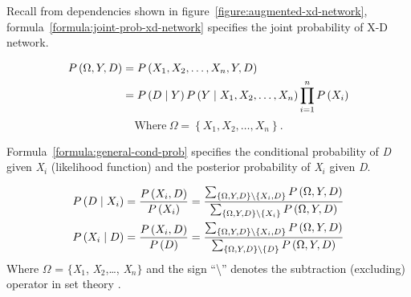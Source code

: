 \documentclass{article}
\numberwithin{equation}{section}
\numberwithin{figure}{section}
\numberwithin{table}{section}
\begin{document}
Recall from dependencies shown in figure~\ref{figure:augmented-xd-network}, formula~\ref{formula:joint-prob-xd-network} specifies the joint probability of X-D network.

\begin{equation}
\begin{split}
P\left(\mathrm{\Omega },Y,D\right)&=P\left(X_1,X_2,\dots ,X_n,Y,D\right)\\
&=P\left(D\mathrel{\left|\vphantom{D Y}\right.\kern-\nulldelimiterspace}Y\right)P\left(Y\mathrel{\left|\vphantom{Y X_1,X_2,\dots ,X_n}\right.\kern-\nulldelimiterspace}X_1,X_2,\dots ,X_n\right)\prod^n_{i=1}{P\left(X_i\right)}
\end{split}
\label{formula:joint-prob-xd-network}
\end{equation}
\[\mathrm{Where}\ \Omega=\left\{X_1,X_2,\dots,X_n\right\}\mathrm{.}\]

\noindent Formula~\ref{formula:general-cond-prob} specifies the conditional probability of \textit{D} given \textit{X${}_{i}$} (likelihood function) and the posterior probability of \textit{X${}_{i}$} given \textit{D}.

\begin{equation}
\begin{split}
&P\left(D\mathrel{\left|\vphantom{D X_i}\right.\kern-\nulldelimiterspace}X_i\right)=\frac{P\left(X_i,D\right)}{P\left(X_i\right)}=\frac{\sum_{\left\{\mathrm{\Omega },Y,D\right\}\backslash \left\{X_i,D\right\}}{P\left(\mathrm{\Omega },Y,D\right)}}{\sum_{\left\{\mathrm{\Omega },Y,D\right\}\backslash \left\{X_i\right\}}{P\left(\mathrm{\Omega },Y,D\right)}}\\
&P\left(X_i\mathrel{\left|\vphantom{X_i D}\right.\kern-\nulldelimiterspace}D\right)=\frac{P\left(X_i,D\right)}{P\left(D\right)}=\frac{\sum_{\left\{\mathrm{\Omega },Y,D\right\}\backslash \left\{X_i,D\right\}}{P\left(\mathrm{\Omega },Y,D\right)}}{\sum_{\left\{\mathrm{\Omega },Y,D\right\}\backslash \left\{D\right\}}{P\left(\mathrm{\Omega },Y,D\right)}}
\end{split}
\label{formula:general-cond-prob}
\end{equation}
Where $\Omega$ = $\{$\textit{X}${}_{1}$, \textit{X}${}_{2}$,{\dots}, \textit{X${}_{n}$}$\}$ and the sign  ``{\textbackslash}''  denotes  the  subtraction  (excluding)  operator in  set  theory \cite{wikipedia:set}.
\end{document}
